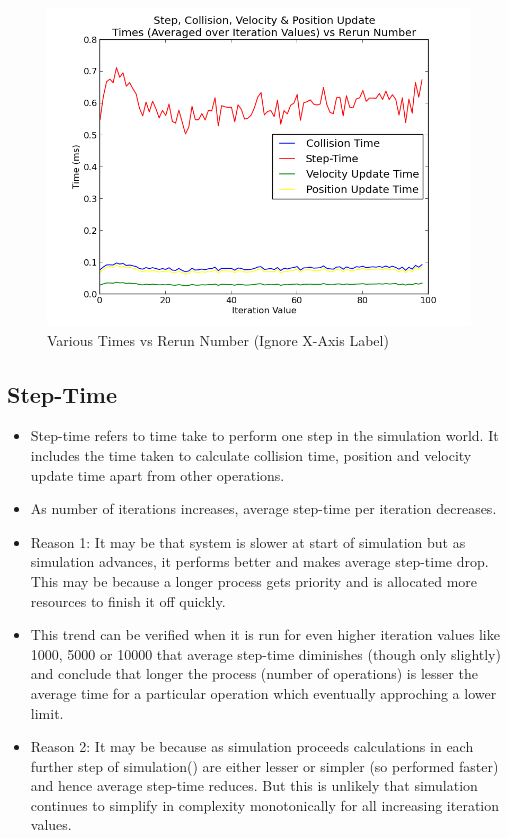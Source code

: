 \documentclass [a4paper, 11pt] {article}
\begin{document}
\begin{figure}[htpb]
	\includegraphics[width=\linewidth]{doc/images/plot04}
	\caption{Various Times vs Rerun Number (Ignore X-Axis Label)}
\end{figure}

\subsection{Step-Time}
\begin{itemize}
	\item Step-time refers to time take to perform one step in the simulation world. It includes the time taken to calculate collision
	time, position and velocity update time apart from other operations.
	\item As number of iterations increases, average step-time per iteration decreases.
	\item Reason 1: It may be that system is slower at start of simulation but as simulation advances, it performs better and makes
	average step-time drop. This may be because a longer process gets priority and is allocated more resources to finish it off quickly.
	\item This trend can be verified when it is run for even higher iteration values like 1000, 5000 or 10000 that average step-time
	diminishes (though only slightly) and conclude that longer the process (number of operations) is lesser the average time for a
	particular operation which eventually approching a lower limit.
	\item Reason 2: It may be because as simulation proceeds calculations in each further step of simulation() are either lesser or
	simpler (so performed faster) and hence average step-time reduces. But this is unlikely that simulation continues to simplify in
	complexity monotonically  for all increasing iteration values.
\end{itemize}
\end{document}
